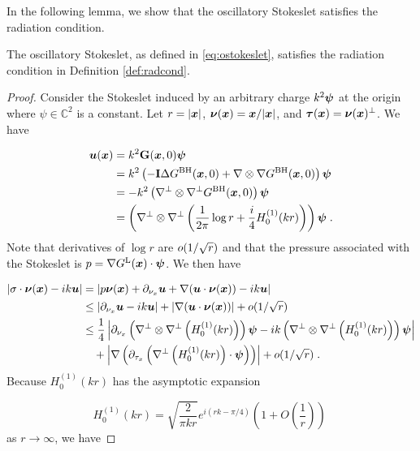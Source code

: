 In the following lemma, we show that the oscillatory
Stokeslet satisfies the radiation condition. 
\begin{lem}
The oscillatory Stokeslet, as defined in \eqref{eq:ostokeslet}, 
satisfies the radiation condition in Definition \ref{def:radcond}.
\end{lem}
\begin{proof}
Consider the Stokeslet induced by an arbitrary charge
$k^2 {\boldsymbol \psi}$ at the origin where $\psi \in \mathbb{C}^2$ 
is a constant. Let $r = |{\boldsymbol x}|$,
${\boldsymbol \nu}({\boldsymbol x}) = {\boldsymbol x}/|{\boldsymbol x}|$, and ${\boldsymbol \tau}({\boldsymbol x}) = {\boldsymbol \nu}({\boldsymbol x})^\perp$. We have

\begin{align*}
{\boldsymbol u} ({\boldsymbol x}) &= k^2 {\bf G}({\boldsymbol x},0) {\boldsymbol \psi} \\
&= k^2 \left (-{\bf I} \Delta G^{\textrm{BH}}({\boldsymbol x},0)
+ \nabla \otimes \nabla G^{\textrm{BH}}({\boldsymbol x},0)\right ) {\boldsymbol \psi} \\
&= -k^2 \left (\nabla^\perp \otimes \nabla^\perp G^{\textrm{BH}}({\boldsymbol x},0) \right) {\boldsymbol \psi} \\
&= \left(\nabla^\perp \otimes \nabla^\perp \left ( \frac{1}{2\pi}
\log r + \frac{i}{4} H_0^{(1)} (kr) \right ) \right){\boldsymbol \psi} \; .
\end{align*}
Note that derivatives of $\log r$ are $o (1/\sqrt{r})$
and that the pressure associated with the Stokeslet is
$p = \nabla G^{\textrm{L}}({\boldsymbol x}) \cdot {\boldsymbol \psi}$. We then have

\begin{align*}
\left | \sigma \cdot {\boldsymbol \nu}({\boldsymbol x}) - i k {\boldsymbol u} \right | &=
\left | p {\boldsymbol \nu}({\boldsymbol x}) + \partial_{{\nu_x}} {\boldsymbol u} + \nabla ({\boldsymbol u} \cdot {\boldsymbol \nu}({\boldsymbol x}))
- ik {\boldsymbol u} \right | \\
&\leq \left | \partial_{{\nu_x}} {\boldsymbol u} - ik{\boldsymbol u} \right | + \left | \nabla({\boldsymbol u} \cdot {\boldsymbol \nu}({\boldsymbol x})) \right |
+ o (1/\sqrt{r}) \\
&\leq \frac{1}{4} \left | \partial_{{\nu_x}} \left(\nabla^\perp \otimes
\nabla^\perp \left (H_0^{(1)} (kr) \right ) \right){\boldsymbol \psi}
- i k \left(\nabla^\perp \otimes \nabla^\perp
\left (H_0^{(1)} (kr) \right ) \right){\boldsymbol \psi} \right | \\
& \quad + \left | \nabla \left( \partial_{\tau_x} \left ( 
\nabla^\perp \left (H_0^{(1)} (kr) \right ) \cdot {\boldsymbol \psi}  \right )
\right) \right | + o (1/\sqrt{r}) \; .
\end{align*}
Because $H_0^{(1)}(kr)$ has the asymptotic expansion 

\begin{equation}
H_0^{(1)}(kr) = \sqrt{\frac{2}{\pi k r}} e^{i(rk-\pi/4)} \left ( 1 + O\left (
\frac{1}{r} \right ) \right ) \; \nonumber
\end{equation}
as $r\to \infty$, we have


\end{proof}
